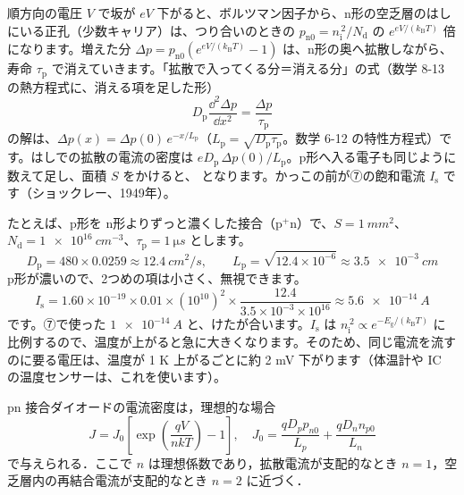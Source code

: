 順方向の電圧 $V$ で坂が $eV$ 下がると、ボルツマン因子から、n形の空乏層のはしにいる正孔（少数キャリア）は、つり合いのときの $p_{\mathrm n0}=n_{\mathrm i}^{\,2}/N_{\mathrm d}$ の $e^{eV/(k_{\mathrm B}T)}$ 倍になります。増えた分 $\Delta p=p_{\mathrm n0}(e^{eV/(k_{\mathrm B}T)}-1)$ は、n形の奥へ拡散しながら、寿命 $\tau_{\mathrm p}$ で消えていきます。「拡散で入ってくる分＝消える分」の式（数学 8-13 の熱方程式に、消える項を足した形）
\[ D_{\mathrm p}\frac{\dd^2\Delta p}{\dd x^2}=\frac{\Delta p}{\tau_{\mathrm p}} \]
の解は、$\Delta p(x)=\Delta p(0)\,e^{-x/L_{\mathrm p}}$（$L_{\mathrm p}=\sqrt{D_{\mathrm p}\tau_{\mathrm p}}$。数学 6-12 の特性方程式）です。はしでの拡散の電流の密度は $eD_{\mathrm p}\,\Delta p(0)/L_{\mathrm p}$。p形へ入る電子も同じように数えて足し、面積 $S$ をかけると、
\label{ph:原-9:shockley}となります。かっこの前が⑦の飽和電流 $I_{\mathrm s}$ です（ショックレー、1949年）。

\begin{phflow}[拡散からダイオードの式へ]
\end{phflow}

\noindent たとえば、p形を n形よりずっと濃くした接合（p$^+$n）で、$S=\qty{1}{mm^2}$、$N_{\mathrm d}=\qty{1e16}{cm^{-3}}$、$\tau_{\mathrm p}=\qty{1}{\micro s}$ とします。
\[ D_{\mathrm p}=480\times0.0259\approx\qty{12.4}{cm^2/s},\qquad L_{\mathrm p}=\sqrt{12.4\times10^{-6}}\approx\qty{3.5e-3}{cm} \]
p形が濃いので、2つめの項は小さく、無視できます。
\[ I_{\mathrm s}=1.60\times10^{-19}\times0.01\times(10^{10})^2\times\frac{12.4}{3.5\times10^{-3}\times10^{16}}\approx\qty{5.6e-14}{A} \]
です。⑦で使った $\qty{1e-14}{A}$ と、けたが合います。$I_{\mathrm s}$ は $n_{\mathrm i}^{\,2}\propto e^{-E_{\mathrm g}/(k_{\mathrm B}T)}$ に比例するので、温度が上がると急に大きくなります。そのため、同じ電流を流すのに要る電圧は、温度が 1 K 上がるごとに約 2 mV 下がります（体温計や IC の温度センサーは、これを使います）。

\begin{senmonsho}[半導体デバイスの専門書の書き方]
\begin{bkhonbun}
pn 接合ダイオードの電流密度は，理想的な場合
\[ J=J_0\left[\exp\left(\frac{qV}{nkT}\right)-1\right],\quad J_0=\frac{qD_pp_{n0}}{L_p}+\frac{qD_nn_{p0}}{L_n} \]
で与えられる．ここで $n$ は理想係数であり，拡散電流が支配的なとき $n=1$，空乏層内の再結合電流が支配的なとき $n=2$ に近づく．
\end{bkhonbun}
\end{senmonsho}

